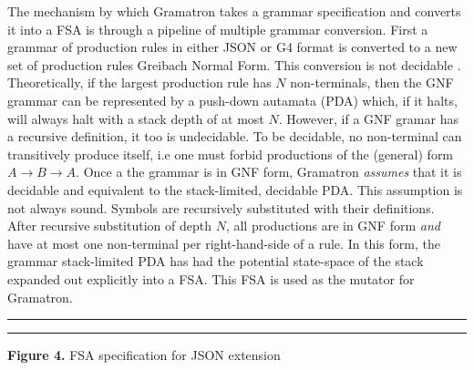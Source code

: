 \documentclass[12pt]{diazessay}
\begin{document}
The mechanism by which Gramatron takes a grammar specification and converts it into a FSA is through a pipeline of multiple grammar conversion.
First a grammar of production rules in either JSON or G4\cite{parr2013definitive} format is converted to a new set of production rules Greibach Normal Form.
This conversion is not decidable \cite{yu1997regular}.
Theoretically, if the largest production rule has $N$ non-terminals, then the GNF grammar can be represented by a push-down autamata (PDA) which, if it halts, will always halt with a stack depth of at most $N$.
However, if a GNF gramar has a recursive definition, it too is undecidable.
To be decidable, no non-terminal can transitively produce itself, i.e one must forbid productions of the (general) form $A \to B \to A$.
Once a the grammar is in GNF form, Gramatron \emph{assumes} that it is decidable and equivalent to the stack-limited, decidable PDA.
This assumption is not always sound.
Symbols are recursively substituted with their definitions.
After recursive substitution of depth $N$, all productions are in GNF form \emph{and} have at most one non-terminal per right-hand-side of a rule.
In this form, the grammar stack-limited PDA has had the potential state-space of the stack expanded out explicitly into a FSA.
This FSA is used as the mutator for Gramatron.

\vspace{10mm}
\hrule height 0.4mm
\begingroup \fontsize{10pt}{10pt} \selectfont \begin{alltt}

\end{alltt} \vspace{-6mm} \endgroup \hrule height 0.4mm
\vspace{6mm}
\centerline{\textbf{Figure 4.} FSA specification for JSON extension}
\vspace{6mm}
\end{document}
